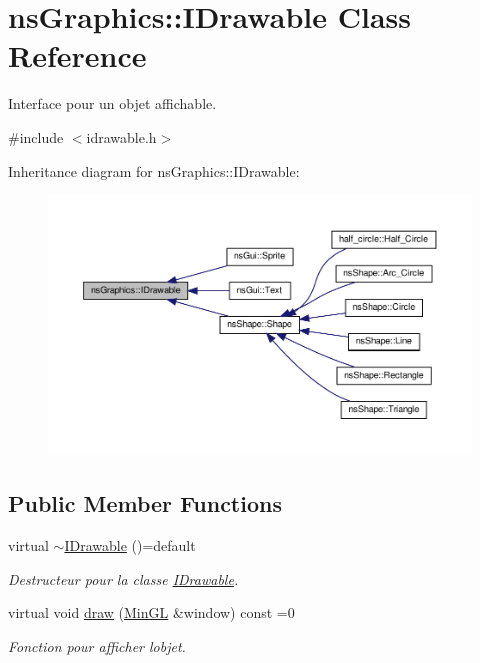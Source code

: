 \hypertarget{classns_graphics_1_1_i_drawable}{}\section{ns\+Graphics\+:\+:I\+Drawable Class Reference}
\label{classns_graphics_1_1_i_drawable}


Interface pour un objet affichable.  




{\ttfamily \#include $<$idrawable.\+h$>$}



Inheritance diagram for ns\+Graphics\+:\+:I\+Drawable\+:
\nopagebreak
\begin{figure}[H]
\begin{center}
\leavevmode
\includegraphics[width=350pt]{classns_graphics_1_1_i_drawable__inherit__graph}
\end{center}
\end{figure}
\subsection*{Public Member Functions}
\begin{DoxyCompactItemize}
\item 
virtual \hyperlink{classns_graphics_1_1_i_drawable_ab7a2ae7682163969bd4627e402ef0867}{$\sim$\+I\+Drawable} ()=default
\begin{DoxyCompactList}\small\item\em Destructeur pour la classe \hyperlink{classns_graphics_1_1_i_drawable}{I\+Drawable}. \end{DoxyCompactList}\item 
virtual void \hyperlink{classns_graphics_1_1_i_drawable_abed8a61e1d507d31e76f0891f3bf9c51}{draw} (\hyperlink{class_min_g_l}{Min\+GL} \&window) const =0
\begin{DoxyCompactList}\small\item\em Fonction pour afficher l\textquotesingle{}objet. \end{DoxyCompactList}\end{DoxyCompactItemize}
